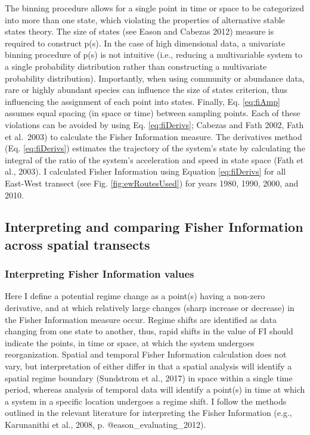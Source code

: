 \documentclass[12pt,twoside,openany]{reedthesis}
\begin{document}
The binning procedure allows for a single point in time or space to be categorized into more than one state, which violating the properties of alternative stable states theory. The size of states (see Eason and Cabezas 2012) measure is required to construct p(s). In the case of high dimensional data, a univariate binning procedure of p(s) is not intuitive (i.e., reducing a multivariable system to a single probability distribution rather than constructing a multivariate probability distribution). Importantly, when using community or abundance data, rare or highly abundant species can influence the size of states criterion, thus influencing the assignment of each point into states. Finally, Eq. \eqref{eq:fiAmp} assumes equal spacing (in space or time) between sampling points. Each of these violations can be avoided by using Eq. \eqref{eq:fiDerivs}; Cabezas and Fath 2002, Fath et al.~2003) to calculate the Fisher Information measure. The derivatives method (Eq. \eqref{eq:fiDerivs}) estimates the trajectory of the system's state by calculating the integral of the ratio of the system's acceleration and speed in state space (Fath et al., 2003). I calculated Fisher Information using Equation \eqref{eq:fiDerivs} for all East-West transect (see Fig. \ref{fig:ewRoutesUsed}) for years 1980, 1990, 2000, and 2010.

\hypertarget{interpreting-and-comparing-fisher-information-across-spatial-transects}{%
\subsection{Interpreting and comparing Fisher Information across spatial transects}\label{interpreting-and-comparing-fisher-information-across-spatial-transects}}

\hypertarget{interpreting-fisher-information-values}{%
\subsubsection{Interpreting Fisher Information values}\label{interpreting-fisher-information-values}}

Here I define a potential regime change as a point(s) having a non-zero derivative, and at which relatively large changes (sharp increase or decrease) in the Fisher Information measure occur. Regime shifts are identified as data changing from one state to another, thus, rapid shifts in the value of FI should indicate the points, in time or space, at which the system undergoes reorganization. Spatial and temporal Fisher Information calculation does not vary, but interpretation of either differ in that a spatial analysis will identify a spatial regime boundary (Sundstrom et al., 2017) in space within a single time period, whereas analysis of temporal data will identify a point(s) in time at which a system in a specific location undergoes a regime shift. I follow the methods outlined in the relevant literature for interpreting the Fisher Information (e.g., Karunanithi et al., 2008, p. @eason\_evaluating\_2012).
\end{document}
